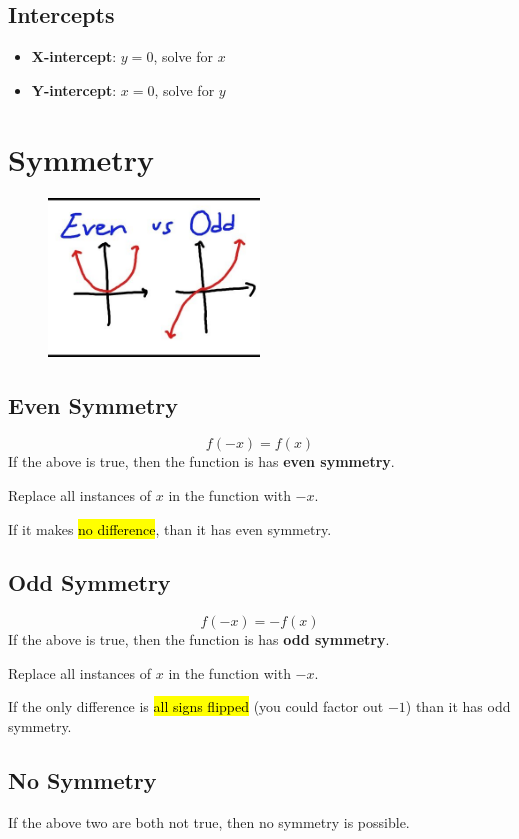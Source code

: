 \documentclass[a4paper,12pt]{article}
\begin{document}
\subsection{Intercepts}
\begin{itemize}
    \item{\textbf{X-intercept}: $y = 0$, solve for $x$}
    \item{\textbf{Y-intercept}: $x = 0$, solve for $y$}
\end{itemize}

\section{Symmetry}
\begin{figure}[H]
    \centering
    \includegraphics[width=0.50\textwidth]{evenodd}
\end{figure}
\subsection{Even Symmetry}
$$f(-x) = f(x)$$
If the above is true, then the function is has \textbf{even symmetry}.

Replace all instances of $x$ in the function with $-x$. 

If it makes \hl{no difference}, than it has even symmetry.

\subsection{Odd Symmetry}
$$f(-x) = -f(x)$$
If the above is true, then the function is has \textbf{odd symmetry}.

Replace all instances of $x$ in the function with $-x$. 

If the only difference is \hl{all signs flipped} (you could factor out $-1$) than it has odd symmetry.

\subsection{No Symmetry}
If the above two are both not true, then no symmetry is possible.
\end{document}
